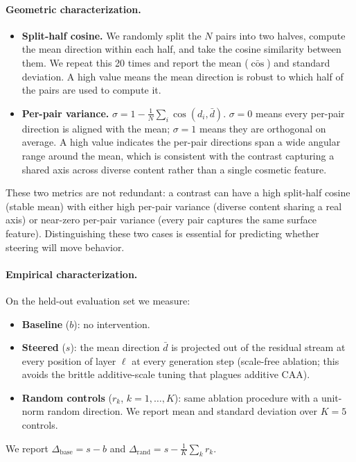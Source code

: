 \documentclass[11pt]{article}
\begin{document}
\paragraph{Geometric characterization.}
\begin{itemize}
\item \textbf{Split-half cosine.} We randomly split the $N$ pairs
into two halves, compute the mean direction within each half, and
take the cosine similarity between them. We repeat this 20 times
and report the mean ($\bar{\cos}$) and standard deviation.
A high value means the mean direction is robust to which half of
the pairs are used to compute it.
\item \textbf{Per-pair variance.}
$\sigma = 1 - \tfrac{1}{N}\sum_i \cos(d_i, \bar d)$.
$\sigma = 0$ means every per-pair direction is aligned with the
mean; $\sigma = 1$ means they are orthogonal on average.
A high value indicates the per-pair directions span a wide angular
range around the mean, which is consistent with the contrast
capturing a shared axis across diverse content rather than a single
cosmetic feature.
\end{itemize}
These two metrics are not redundant: a contrast can have a high
split-half cosine (stable mean) with either high per-pair variance
(diverse content sharing a real axis) or near-zero per-pair variance
(every pair captures the same surface feature). Distinguishing these
two cases is essential for predicting whether steering will move
behavior.

\paragraph{Empirical characterization.}
On the held-out evaluation set we measure:
\begin{itemize}
\item \textbf{Baseline} ($b$): no intervention.
\item \textbf{Steered} ($s$): the mean direction $\bar d$ is
projected out of the residual stream at every position of layer
$\ell$ at every generation step (scale-free ablation; this avoids
the brittle additive-scale tuning that plagues additive CAA).
\item \textbf{Random controls} ($r_k$, $k = 1,\ldots,K$): same
ablation procedure with a unit-norm random direction. We report
mean and standard deviation over $K = 5$ controls.
\end{itemize}
We report
$\Delta_{\text{base}} = s - b$ and
$\Delta_{\text{rand}} = s - \tfrac{1}{K}\sum_k r_k$.
\end{document}
